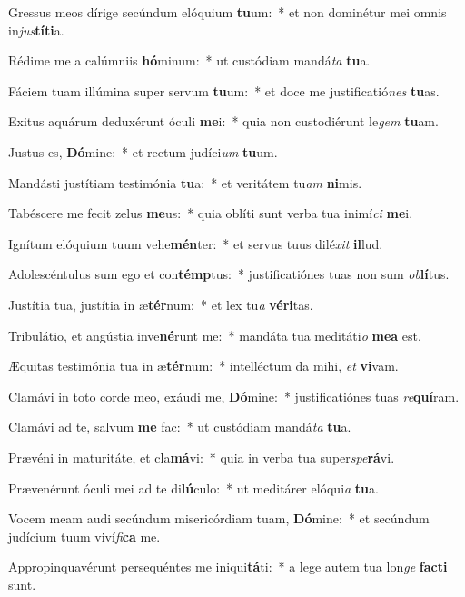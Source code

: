 \item Gressus meos dírige secúndum elóquium \textbf{tu}um:~* et non dominétur mei omnis in\textit{jus}\textbf{tí}\textbf{ti}a.
\item Rédime me a calúmniis \textbf{hó}minum:~* ut custódiam mandá\textit{ta} \textbf{tu}a.
\item Fáciem tuam illúmina super servum \textbf{tu}um:~* et doce me justificatió\textit{nes} \textbf{tu}as.
\item Exitus aquárum deduxérunt óculi \textbf{me}i:~* quia non custodiérunt le\textit{gem} \textbf{tu}am.
\item Justus es, \textbf{Dó}mine:~* et rectum judíci\textit{um} \textbf{tu}um.
\item Mandásti justítiam testimónia \textbf{tu}a:~* et veritátem tu\textit{am} \textbf{ni}mis.
\item Tabéscere me fecit zelus \textbf{me}us:~* quia oblíti sunt verba tua inimí\textit{ci} \textbf{me}i.
\item Ignítum elóquium tuum vehe\textbf{mén}ter:~* et servus tuus dilé\textit{xit} \textbf{il}lud.
\item Adolescéntulus sum ego et con\textbf{témp}tus:~* justificatiónes tuas non sum \textit{ob}\textbf{lí}tus.
\item Justítia tua, justítia in æ\textbf{tér}num:~* et lex tu\textit{a} \textbf{vé}\textbf{ri}tas.
\item Tribulátio, et angústia inve\textbf{né}runt me:~* mandáta tua meditáti\textit{o} \textbf{me}\textbf{a} est.
\item Æquitas testimónia tua in æ\textbf{tér}num:~* intelléctum da mihi, \textit{et} \textbf{vi}vam.
\item Clamávi in toto corde meo, exáudi me, \textbf{Dó}mine:~* justificatiónes tuas \textit{re}\textbf{quí}ram.
\item Clamávi ad te, salvum \textbf{me} fac:~* ut custódiam mandá\textit{ta} \textbf{tu}a.
\item Prævéni in maturitáte, et cla\textbf{má}vi:~* quia in verba tua super\textit{spe}\textbf{rá}vi.
\item Prævenérunt óculi mei ad te di\textbf{lú}culo:~* ut meditárer elóqui\textit{a} \textbf{tu}a.
\item Vocem meam audi secúndum misericórdiam tuam, \textbf{Dó}mine:~* et secúndum judícium tuum viví\textit{fi}\textbf{ca} me.
\item Appropinquavérunt persequéntes me iniqui\textbf{tá}ti:~* a lege autem tua lon\textit{ge} \textbf{fac}\textbf{ti} sunt.
